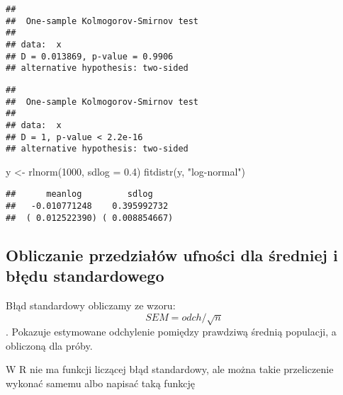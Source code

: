 \documentclass[
]{book}
\newenvironment{Shaded}{\begin{snugshade}}{\end{snugshade}}
\newcommand{\AttributeTok}[1]{\textcolor[rgb]{0.77,0.63,0.00}{#1}}
\newcommand{\DecValTok}[1]{\textcolor[rgb]{0.00,0.00,0.81}{#1}}
\newcommand{\FloatTok}[1]{\textcolor[rgb]{0.00,0.00,0.81}{#1}}
\newcommand{\FunctionTok}[1]{\textcolor[rgb]{0.00,0.00,0.00}{#1}}
\newcommand{\NormalTok}[1]{#1}
\newcommand{\OtherTok}[1]{\textcolor[rgb]{0.56,0.35,0.01}{#1}}
\newcommand{\SpecialCharTok}[1]{\textcolor[rgb]{0.00,0.00,0.00}{#1}}
\newcommand{\StringTok}[1]{\textcolor[rgb]{0.31,0.60,0.02}{#1}}
\begin{document}
\begin{verbatim}
## 
##  One-sample Kolmogorov-Smirnov test
## 
## data:  x
## D = 0.013869, p-value = 0.9906
## alternative hypothesis: two-sided
\end{verbatim}

\begin{Shaded}
\end{Shaded}

\begin{verbatim}
## 
##  One-sample Kolmogorov-Smirnov test
## 
## data:  x
## D = 1, p-value < 2.2e-16
## alternative hypothesis: two-sided
\end{verbatim}

\begin{Shaded}
\begin{Highlighting}[]
\NormalTok{y }\OtherTok{\textless{}{-}} \FunctionTok{rlnorm}\NormalTok{(}\DecValTok{1000}\NormalTok{, }\AttributeTok{sdlog =} \FloatTok{0.4}\NormalTok{)}
\FunctionTok{fitdistr}\NormalTok{(y, }\StringTok{"log{-}normal"}\NormalTok{)}
\end{Highlighting}
\end{Shaded}

\begin{verbatim}
##      meanlog         sdlog    
##   -0.010771248    0.395992732 
##  ( 0.012522390) ( 0.008854667)
\end{verbatim}

\hypertarget{obliczanie-przedziaux142uxf3w-ufnoux15bci-dla-ux15bredniej-i-bux142ux119du-standardowego}{%
\subsection{Obliczanie przedziałów ufności dla średniej i błędu standardowego}\label{obliczanie-przedziaux142uxf3w-ufnoux15bci-dla-ux15bredniej-i-bux142ux119du-standardowego}}

Błąd standardowy obliczamy ze wzoru: \[SEM= odch/\sqrt{n}\]. Pokazuje estymowane odchylenie pomiędzy prawdziwą średnią populacji, a obliczoną dla próby.

W R nie ma funkcji liczącej błąd standardowy, ale można takie przeliczenie wykonać samemu albo napisać taką funkcję
\end{document}
